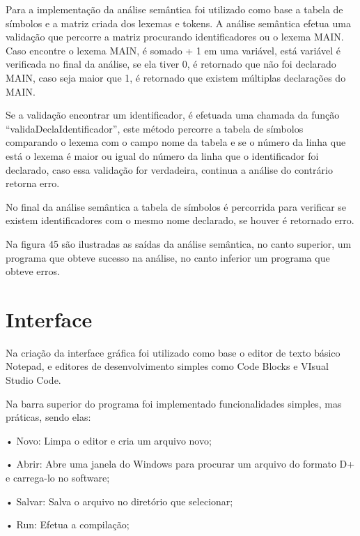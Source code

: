 \documentclass[12pt,oneside,a4paper,chapter=TITLE,section=TITLE,sumario=tradicional]{abntex2}
\begin{document}
Para a implementação da análise semântica foi utilizado como base a tabela de símbolos e a matriz criada dos lexemas e tokens. A análise semântica efetua uma validação que percorre a matriz procurando identificadores ou o lexema MAIN. Caso encontre o lexema MAIN, é somado + 1 em uma variável, está variável é verificada no final da análise, se ela tiver 0, é retornado que não foi declarado MAIN, caso seja maior que 1, é retornado que existem múltiplas declarações do MAIN.

Se a validação encontrar um identificador, é efetuada uma chamada da função “validaDeclaIdentificador”, este método percorre a tabela de símbolos comparando o lexema com o campo nome da tabela e se o número da linha que está o lexema é maior ou igual do número da linha que o identificador foi declarado, caso essa validação for verdadeira, continua a análise do contrário retorna erro. 

No final da análise semântica a tabela de símbolos é percorrida para verificar se existem identificadores com o mesmo nome declarado, se houver é retornado erro.

Na figura 45 são ilustradas as saídas da análise semântica, no canto superior, um programa que obteve sucesso na análise, no canto inferior um programa que obteve erros.

\begin{figure}[htb]
\end{figure} 

\section{Interface}
\label{sec:interface}

Na criação da interface gráfica foi utilizado como base o editor de texto básico Notepad, e editores de desenvolvimento simples como Code Blocks e VIsual Studio Code. 

Na barra superior do programa foi implementado funcionalidades simples, mas práticas, sendo elas:

•	Novo: Limpa o editor e cria um arquivo novo;

•	Abrir: Abre uma janela do Windows para procurar um arquivo do formato D+ e carrega-lo no software;

•	Salvar: Salva o arquivo no diretório que selecionar;

•	Run: Efetua a compilação;
\end{document}
